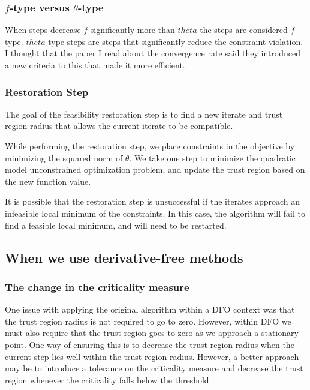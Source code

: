 \documentclass{article}
\begin{document}
\subsubsection{$f$-type versus $\theta$-type}

When steps decrease $f$ significantly more than $theta$ the steps are considered $f$ type.
$theta$-type steps are steps that significantly reduce the constraint violation.
I thought that the paper I read about the convergence rate said they introduced a new criteria to this that made it more efficient.

\subsubsection{Restoration Step}

The goal of the feasibility restoration step is to find a new iterate and trust region radius that allows the current iterate to be compatible.

While performing the restoration step, we place constraints in the objective by minimizing the squared norm of $\theta$.
We take one step to minimize the quadratic model unconstrained optimization problem, and update the trust region based on the new function value.

It is possible that the restoration step is unsuccessful if the iterates approach an infeasible local minimum of the constraints.
In this case, the algorithm will fail to find a feasible local minimum, and will need to be restarted.


\subsection{When we use derivative-free methods}

\subsubsection{The change in the criticality measure}
One issue with applying the original algorithm within a DFO context was that the trust region radius is not required to go to zero. However, within DFO we must also require that the trust region goes to zero as we approach a stationary point. One way of ensuring this is to decrease the trust region radius when the current step lies well within the trust region radius. However, a better approach may be to introduce a tolerance on the criticality measure and decrease the trust region whenever the criticality falls below the threshold.
\end{document}
